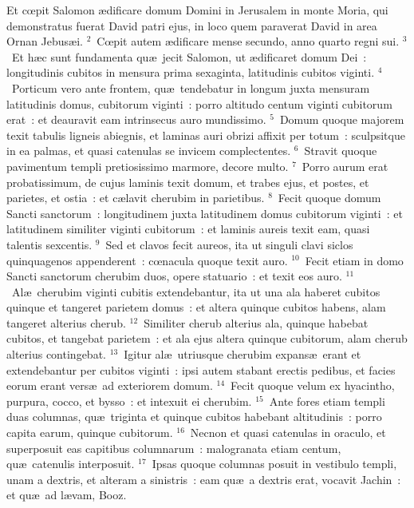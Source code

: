 \bchapter
\lettrine[lines=3,image=true,loversize=0.05,lraise=-0.03]{E}{}t cœpit Salomon \ae dificare domum Domini in Jerusalem in monte Moria, qui demonstratus fuerat David patri ejus, in loco quem paraverat David in area Ornan Jebus\ae i.
${}^{2}$~Cœpit autem \ae dificare mense secundo, anno quarto regni sui.
${}^{3}$~Et h\ae c sunt fundamenta qu\ae\ jecit Salomon, ut \ae dificaret domum Dei~: longitudinis cubitos in mensura prima sexaginta, latitudinis cubitos viginti.
${}^{4}$~Porticum vero ante frontem, qu\ae\ tendebatur in longum juxta mensuram latitudinis domus, cubitorum viginti~: porro altitudo centum viginti cubitorum erat~: et deauravit eam intrinsecus auro mundissimo.
${}^{5}$~Domum quoque majorem texit tabulis ligneis abiegnis, et laminas auri obrizi affixit per totum~: sculpsitque in ea palmas, et quasi catenulas se invicem complectentes.
${}^{6}$~Stravit quoque pavimentum templi pretiosissimo marmore, decore multo.
${}^{7}$~Porro aurum erat probatissimum, de cujus laminis texit domum, et trabes ejus, et postes, et parietes, et ostia~: et c\ae lavit cherubim in parietibus.
${}^{8}$~Fecit quoque domum Sancti sanctorum~: longitudinem juxta latitudinem domus cubitorum viginti~: et latitudinem similiter viginti cubitorum~: et laminis aureis texit eam, quasi talentis sexcentis.
${}^{9}$~Sed et clavos fecit aureos, ita ut singuli clavi siclos quinquagenos appenderent~: cœnacula quoque texit auro.
${}^{10}$~Fecit etiam in domo Sancti sanctorum cherubim duos, opere statuario~: et texit eos auro.
${}^{11}$~Al\ae\ cherubim viginti cubitis extendebantur, ita ut una ala haberet cubitos quinque et tangeret parietem domus~: et altera quinque cubitos habens, alam tangeret alterius cherub.
${}^{12}$~Similiter cherub alterius ala, quinque habebat cubitos, et tangebat parietem~: et ala ejus altera quinque cubitorum, alam cherub alterius contingebat.
${}^{13}$~Igitur al\ae\ utriusque cherubim expans\ae\ erant et extendebantur per cubitos viginti~: ipsi autem stabant erectis pedibus, et facies eorum erant vers\ae\ ad exteriorem domum.
${}^{14}$~Fecit quoque velum ex hyacintho, purpura, cocco, et bysso~: et intexuit ei cherubim.
${}^{15}$~Ante fores etiam templi duas columnas, qu\ae\ triginta et quinque cubitos habebant altitudinis~: porro capita earum, quinque cubitorum.
${}^{16}$~Necnon et quasi catenulas in oraculo, et superposuit eas capitibus columnarum~: malogranata etiam centum, qu\ae\ catenulis interposuit.
${}^{17}$~Ipsas quoque columnas posuit in vestibulo templi, unam a dextris, et alteram a sinistris~: eam qu\ae\ a dextris erat, vocavit Jachin~: et qu\ae\ ad l\ae vam, Booz.

